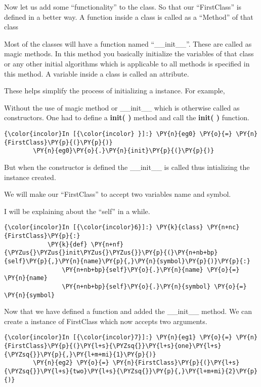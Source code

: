     Now let us add some ``functionality'' to the class. So that our
``FirstClass'' is defined in a better way. A function inside a class is
called as a ``Method'' of that class

    Most of the classes will have a function named ``\_\_init\_\_''. These
are called as magic methods. In this method you basically initialize the
variables of that class or any other initial algorithms which is
applicable to all methods is specified in this method. A variable inside
a class is called an attribute.

    These helps simplify the process of initializing a instance. For
example,

Without the use of magic method or \_\_init\_\_ which is otherwise
called as constructors. One had to define a \textbf{init( )} method and
call the \textbf{init( )} function.

    \begin{Verbatim}[commandchars=\\\{\}]
{\color{incolor}In [{\color{incolor} }]:} \PY{n}{eg0} \PY{o}{=} \PY{n}{FirstClass}\PY{p}{(}\PY{p}{)}
        \PY{n}{eg0}\PY{o}{.}\PY{n}{init}\PY{p}{(}\PY{p}{)}
\end{Verbatim}

    But when the constructor is defined the \_\_init\_\_ is called thus
intializing the instance created.

    We will make our ``FirstClass'' to accept two variables name and symbol.

I will be explaining about the ``self'' in a while.

    \begin{Verbatim}[commandchars=\\\{\}]
{\color{incolor}In [{\color{incolor}6}]:} \PY{k}{class} \PY{n+nc}{FirstClass}\PY{p}{:}
            \PY{k}{def} \PY{n+nf}{\PYZus{}\PYZus{}init\PYZus{}\PYZus{}}\PY{p}{(}\PY{n+nb+bp}{self}\PY{p}{,}\PY{n}{name}\PY{p}{,}\PY{n}{symbol}\PY{p}{)}\PY{p}{:}
                \PY{n+nb+bp}{self}\PY{o}{.}\PY{n}{name} \PY{o}{=} \PY{n}{name}
                \PY{n+nb+bp}{self}\PY{o}{.}\PY{n}{symbol} \PY{o}{=} \PY{n}{symbol}
\end{Verbatim}

    Now that we have defined a function and added the \_\_init\_\_ method.
We can create a instance of FirstClass which now accepts two arguments.

    \begin{Verbatim}[commandchars=\\\{\}]
{\color{incolor}In [{\color{incolor}7}]:} \PY{n}{eg1} \PY{o}{=} \PY{n}{FirstClass}\PY{p}{(}\PY{l+s}{\PYZsq{}}\PY{l+s}{one}\PY{l+s}{\PYZsq{}}\PY{p}{,}\PY{l+m+mi}{1}\PY{p}{)}
        \PY{n}{eg2} \PY{o}{=} \PY{n}{FirstClass}\PY{p}{(}\PY{l+s}{\PYZsq{}}\PY{l+s}{two}\PY{l+s}{\PYZsq{}}\PY{p}{,}\PY{l+m+mi}{2}\PY{p}{)}
\end{Verbatim}

